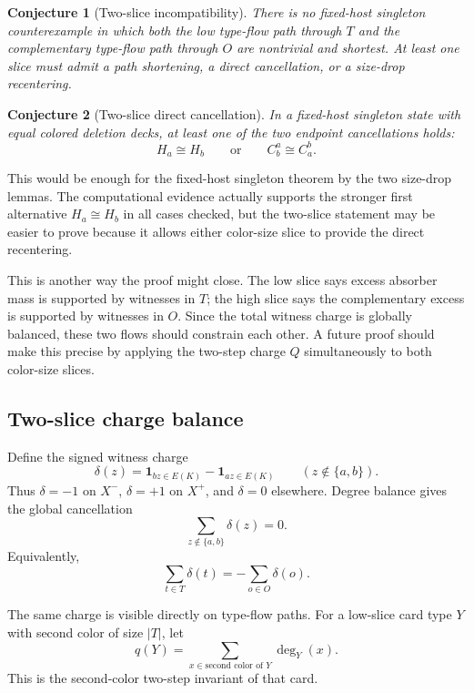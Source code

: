 \documentclass[11pt]{article}
\newtheorem{conjecture}{Conjecture}
\newcommand{\one}{\mathbf{1}}
\begin{document}
\begin{conjecture}[Two-slice incompatibility]
There is no fixed-host singleton counterexample in which both the low
type-flow path through \(T\) and the complementary type-flow path through
\(O\) are nontrivial and shortest.  At least one slice must admit a path
shortening, a direct cancellation, or a size-drop recentering.
\end{conjecture}

\begin{conjecture}[Two-slice direct cancellation]
In a fixed-host singleton state with equal colored deletion decks, at least
one of the two endpoint cancellations holds:
\[
  H_a\cong H_b
  \qquad\text{or}\qquad
  C_b^a\cong C_a^b.
\]
\end{conjecture}

This would be enough for the fixed-host singleton theorem by the two
size-drop lemmas.  The computational evidence actually supports the stronger
first alternative \(H_a\cong H_b\) in all cases checked, but the two-slice
statement may be easier to prove because it allows either color-size slice to
provide the direct recentering.

This is another way the proof might close.  The low slice says excess
absorber mass is supported by witnesses in \(T\); the high slice says the
complementary excess is supported by witnesses in \(O\).  Since the total
witness charge is globally balanced, these two flows should constrain each
other.  A future proof should make this precise by applying the two-step
charge \(Q\) simultaneously to both color-size slices.

\subsection{Two-slice charge balance}

Define the signed witness charge
\[
  \delta(z)=\one_{bz\in E(K)}-\one_{az\in E(K)}
  \qquad (z\notin\{a,b\}).
\]
Thus \(\delta=-1\) on \(X^-\), \(\delta=+1\) on \(X^+\), and
\(\delta=0\) elsewhere.  Degree balance gives the global cancellation
\[
  \sum_{z\notin\{a,b\}}\delta(z)=0.
\]
Equivalently,
\[
  \sum_{t\in T}\delta(t)
  =
  -\sum_{o\in O}\delta(o).
\]

The same charge is visible directly on type-flow paths.  For a low-slice card
type \(Y\) with second color of size \(|T|\), let
\[
  q(Y)=\sum_{x\in\text{second color of }Y}\deg_Y(x).
\]
This is the second-color two-step invariant of that card.
\end{document}
